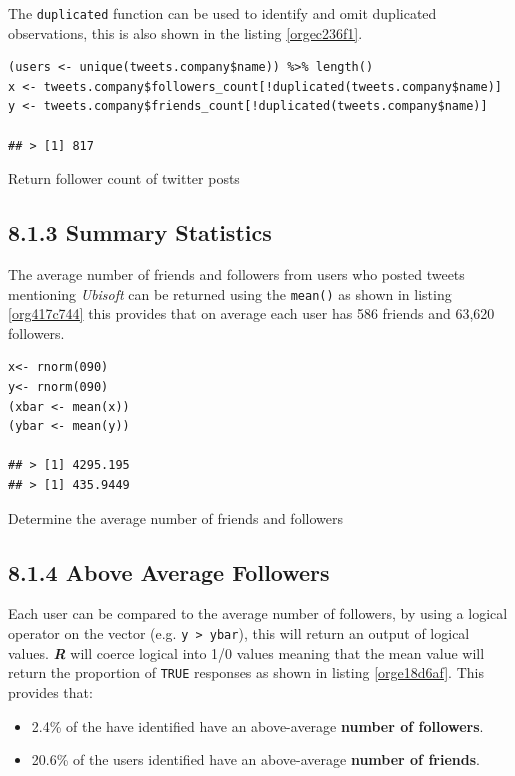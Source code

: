 \documentclass[11pt]{article}
\begin{document}
The \texttt{duplicated} function can be used to identify and omit duplicated observations, this is also shown in the listing \ref{orgec236f1}.

\begin{listing}[htbp]
\begin{verbatim}
(users <- unique(tweets.company$name)) %>% length()
x <- tweets.company$followers_count[!duplicated(tweets.company$name)]
y <- tweets.company$friends_count[!duplicated(tweets.company$name)]

## > [1] 817
\end{verbatim}
\caption{\label{orgec236f1}Return follower count of twitter posts}
\end{listing}


\subsection{8.1.3 Summary Statistics}
\label{sec:orgc8d7079}
The average number of friends and followers from users who posted tweets mentioning \emph{Ubisoft} can be returned using the \texttt{mean()} as shown in listing \ref{org417c744}
this provides that on average each user has 586 friends and 63,620 followers.

\begin{listing}[htbp]
\begin{verbatim}
x<- rnorm(090)
y<- rnorm(090)
(xbar <- mean(x))
(ybar <- mean(y))

## > [1] 4295.195
## > [1] 435.9449
\end{verbatim}
\caption{\label{org417c744}Determine the average number of friends and followers}
\end{listing}

\subsection{8.1.4 Above Average Followers}
\label{sec:orgd5ea60e}
Each user can be compared to the average number of followers, by using a logical
operator on the vector (e.g. \texttt{y > ybar}), this will return an output of logical
values. \textbf{\emph{R}} will coerce logical into 1/0 values meaning that the mean value
will return the proportion of \texttt{TRUE} responses as shown in listing \ref{orge18d6af}. This
provides that:

\begin{itemize}
\item 2.4\%  of the have identified have an above-average \textbf{number of followers}.
\item 20.6\% of the users identified have an above-average \textbf{number of friends}.
\end{itemize}
\end{document}
